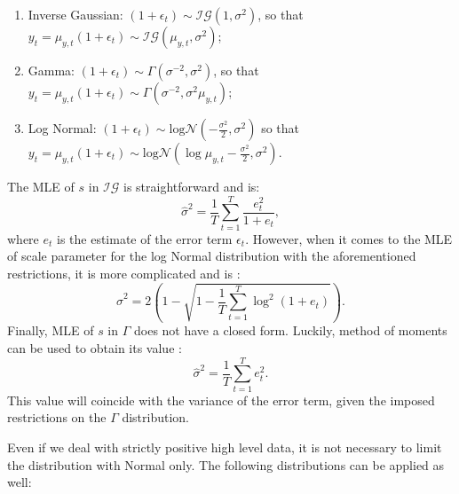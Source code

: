 \documentclass[
]{book}
\providecommand{\tightlist}{%
  \setlength{\itemsep}{0pt}\setlength{\parskip}{0pt}}
\theoremstyle{definition}
\theoremstyle{definition}
\theoremstyle{definition}
\theoremstyle{definition}
\theoremstyle{remark}
\begin{document}
\begin{enumerate}
\def\labelenumi{\arabic{enumi}.}
\tightlist
\item
  Inverse Gaussian: \(\left(1+\epsilon_t \right) \sim \mathcal{IG}(1, \sigma^2)\), so that \(y_t = \mu_{y,t} (1+\epsilon_t) \sim \mathcal{IG}(\mu_{y,t}, \sigma^2)\);
\item
  Gamma: \(\left(1+\epsilon_t \right) \sim \Gamma (\sigma^{-2}, \sigma^2)\), so that \(y_t = \mu_{y,t} (1+\epsilon_t) \sim \Gamma (\sigma^{-2}, \sigma^2 \mu_{y,t})\);
\item
  Log Normal: \(\left(1+\epsilon_t \right) \sim \mathrm{log}\mathcal{N}\left(-\frac{\sigma^2}{2}, \sigma^2\right)\) so that \(y_t = \mu_{y,t} (1+\epsilon_t) \sim \mathrm{log}\mathcal{N}(\log \mu_{y,t} -\frac{\sigma^2}{2}, \sigma^2)\).
\end{enumerate}

The MLE of \(s\) in \(\mathcal{IG}\) is straightforward and is:
\begin{equation}
    \hat{\sigma}^2 = \frac{1}{T} \sum_{t=1}^{T} \frac{e_{t}^2}{1+e_t} ,
    \label{eq:ETSMultiplicativeErrorMLESigmaIG}
\end{equation}
where \(e_t\) is the estimate of the error term \(\epsilon_t\). However, when it comes to the MLE of scale parameter for the log Normal distribution with the aforementioned restrictions, it is more complicated and is \citep{Svetunkov2020ETS}:
\begin{equation}
    \hat{\sigma}^2 = 2\left(1-\sqrt{ 1-\frac{1}{T} \sum_{t=1}^{T} \log^2(1+e_{t})}\right).
    \label{eq:ETSMultiplicativeErrorMLESigmaLogN}
\end{equation}
Finally, MLE of \(s\) in \(\mathcal{\Gamma}\) does not have a closed form. Luckily, method of moments can be used to obtain its value \citep{Svetunkov2020ETS}:
\begin{equation}
    \hat{\sigma}^2 = \frac{1}{T} \sum_{t=1}^{T} e_{t}^2 .
    \label{eq:ETSMultiplicativeErrorMLESigmaGamma}
\end{equation}
This value will coincide with the variance of the error term, given the imposed restrictions on the \(\Gamma\) distribution.

Even if we deal with strictly positive high level data, it is not necessary to limit the distribution with Normal only. The following distributions can be applied as well:
\end{document}
